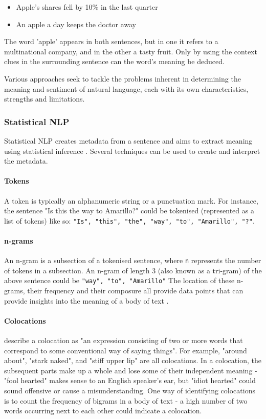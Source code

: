 \begin{itemize}
	\item Apple's shares fell by 10\% in the last quarter
	\item An apple a day keeps the doctor away
\end{itemize}

The word 'apple' appears in both sentences, but in one it refers to a multinational company, and in the other a tasty fruit. Only by using the context clues in the surrounding sentence can the word's meaning be deduced.

Various approaches seek to tackle the problems inherent in determining the meaning and sentiment of natural language, each with its own characteristics, strengths and limitations. 

\subsubsection{Statistical NLP}
Statistical NLP creates metadata from a sentence and aims to extract meaning using statistical inference \cite{manning1999}. Several techniques can be used to create and interpret the metadata.

\paragraph{Tokens}
A token is typically an alphanumeric string or a punctuation mark. For instance, the sentence "Is this the way to Amarillo?" could be tokenised (represented as a list of tokens) like so: \texttt{"Is", "this", "the", "way", "to", "Amarillo", "?"}.\par
	
\paragraph{n-grams}
An n-gram is a subsection of a tokenised sentence, where \texttt{n} represents the number of tokens in a subsection. An n-gram of length 3 (also known as a tri-gram) of the above sentence could be \texttt{"way", "to", "Amarillo"}
	The location of these n-grams, their frequency and their composure all provide data points that can provide insights into the meaning of a body of text \cite{banerjee2003}.
	
\paragraph{Colocations}
\citeauthor{manning1999} describe a colocation as "an expression consisting of two or more words that correspond to some conventional way of saying things". For example, "around about", "stark naked", and "stiff upper lip" are all colocations. In a colocation, the subsequent parts make up a whole and lose some of their independent meaning - "fool hearted" makes sense to an English speaker's ear, but "idiot hearted" could sound offensive or cause a misunderstanding.
	One way of identifying colocations is to count the frequency of bigrams in a body of text - a high number of two words occurring next to each other could indicate a colocation. \\

